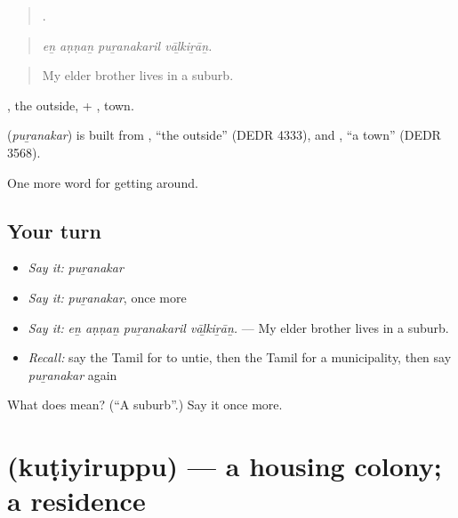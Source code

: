 \begin{quote}
   .
\end{quote}

\begin{quote}
\emph{eṉ aṇṇaṉ puṟanakaril vāḻkiṟāṉ.}
\end{quote}

\begin{quote}
My elder brother lives in a suburb.
\end{quote}

, the outside, + , town.

\begin{cousinweb}
\textbf{} (\emph{puṟanakar}) is built from , \textquotedblleft{}the outside\textquotedblright{} (DEDR 4333), and , \textquotedblleft{}a town\textquotedblright{} (DEDR 3568).
\end{cousinweb}

\begin{grammarlens}[title={What you've built}]
One more word for getting around.
\end{grammarlens}

\subsection*{Your turn}
\begin{itemize}
\raggedright
  \item \emph{Say it:} \emph{puṟanakar}
  \item \emph{Say it:} \emph{puṟanakar}, once more
  \item \emph{Say it:} \emph{eṉ aṇṇaṉ puṟanakaril vāḻkiṟāṉ.} — My elder brother lives in a suburb.
  \item \emph{Recall:} say the Tamil for to untie, then the Tamil for a municipality, then say \emph{puṟanakar} again
\end{itemize}

\begin{tcolorbox}[breakable,colback=teal!4,colframe=teal!35!black,title={Before you move on}]
What does  mean? (\textquotedblleft{}A suburb\textquotedblright{}.) Say it once more.
\end{tcolorbox}
\section[\texorpdfstring{\ta{குடியிருப்பு} (kuṭiyiruppu)}{குடியிருப்பு (kuṭiyiruppu)}]{ (kuṭiyiruppu) — a housing colony; a residence}


